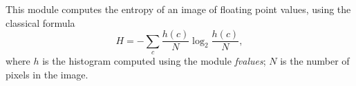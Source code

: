 This module computes the entropy of an image of floating point values,
using the classical formula
$$H = - \sum_{c} \frac{h(c)}N \log_2 \frac{h(c)}N,$$
where $h$ is the histogram computed using the module {\em fvalues};
$N$ is the number of pixels in the image. 
